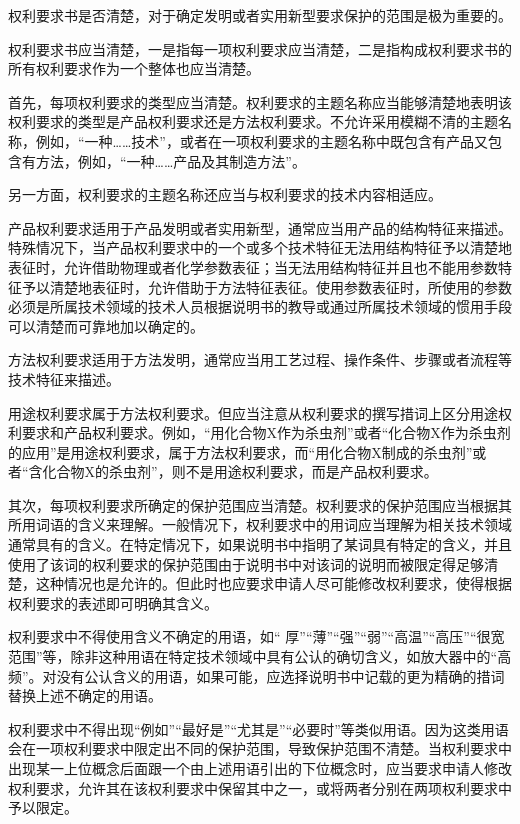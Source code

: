 权利要求书是否清楚，对于确定发明或者实用新型要求保护的范围是极为重要的。

权利要求书应当清楚，一是指每一项权利要求应当清楚，二是指构成权利要求书的所有权利要求作为一个整体也应当清楚。

首先，每项权利要求的类型应当清楚。权利要求的主题名称应当能够清楚地表明该权利要求的类型是产品权利要求还是方法权利要求。不允许采用模糊不清的主题名称，例如，“一种……技术”，或者在一项权利要求的主题名称中既包含有产品又包含有方法，例如，“一种……产品及其制造方法”。

另一方面，权利要求的主题名称还应当与权利要求的技术内容相适应。

产品权利要求适用于产品发明或者实用新型，通常应当用产品的结构特征来描述。特殊情况下，当产品权利要求中的一个或多个技术特征无法用结构特征予以清楚地表征时，允许借助物理或者化学参数表征；当无法用结构特征并且也不能用参数特征予以清楚地表征时，允许借助于方法特征表征。使用参数表征时，所使用的参数必须是所属技术领域的技术人员根据说明书的教导或通过所属技术领域的惯用手段可以清楚而可靠地加以确定的。

方法权利要求适用于方法发明，通常应当用工艺过程、操作条件、步骤或者流程等技术特征来描述。

用途权利要求属于方法权利要求。但应当注意从权利要求的撰写措词上区分用途权利要求和产品权利要求。例如，“用化合物X作为杀虫剂”或者“化合物X作为杀虫剂的应用”是用途权利要求，属于方法权利要求，而“用化合物X制成的杀虫剂”或者“含化合物X的杀虫剂”，则不是用途权利要求，而是产品权利要求。

其次，每项权利要求所确定的保护范围应当清楚。权利要求的保护范围应当根据其所用词语的含义来理解。一般情况下，权利要求中的用词应当理解为相关技术领域通常具有的含义。在特定情况下，如果说明书中指明了某词具有特定的含义，并且使用了该词的权利要求的保护范围由于说明书中对该词的说明而被限定得足够清楚，这种情况也是允许的。但此时也应要求申请人尽可能修改权利要求，使得根据权利要求的表述即可明确其含义。

权利要求中不得使用含义不确定的用语，如“ 厚”“薄”“强”“弱”“高温”“高压”“很宽范围”等，除非这种用语在特定技术领域中具有公认的确切含义，如放大器中的“高频”。对没有公认含义的用语，如果可能，应选择说明书中记载的更为精确的措词替换上述不确定的用语。

权利要求中不得出现“例如”“最好是”“尤其是”“必要时”等类似用语。因为这类用语会在一项权利要求中限定出不同的保护范围，导致保护范围不清楚。当权利要求中出现某一上位概念后面跟一个由上述用语引出的下位概念时，应当要求申请人修改权利要求，允许其在该权利要求中保留其中之一，或将两者分别在两项权利要求中予以限定。

